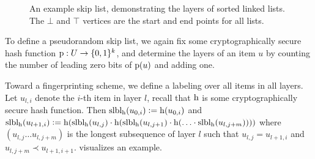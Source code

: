 \begin{figure*}
\begin{scaletikzpicturetowidth}{\textwidth}
\end{scaletikzpicturetowidth}

\caption{
An example skip list, demonstrating the layers of sorted linked lists. The $\bot$ and $\top$ vertices are the start and end points for all lists.
}

\label{fig:skip-list-example}
\end{figure*}

To define a pseudorandom skip list, we again fix some cryptographically secure hash function ${\operatorname{p}}: {U} \rightarrow {\{0, 1\}^k}$, and determine the layers of an item $u$ by counting the number of leading zero bits of $\operatorname{p}(u)$ and adding one.

Toward a fingerprinting scheme, we define a labeling over all items in all layers. Let $u_{l, i}$ denote the $i$-th item in layer $l$, recall that $\operatorname{h}$ is some cryptographically secure hash function.
Then $\operatorname{slbl_{\operatorname{h}}}(u_{0, i}) \vcentcolon= \operatorname{h}(u_{0, i})$ and $\operatorname{slbl_{\operatorname{h}}}(u_{l + 1, i}) \vcentcolon= \operatorname{h}(\operatorname{slbl_{\operatorname{h}}}(u_{l, j}) \cdot \operatorname{h}( \operatorname{slbl_{\operatorname{h}}}(u_{l, j + 1}) \cdot \operatorname{h}(\ldots \cdot \operatorname{slbl_{\operatorname{h}}}(u_{l, j + m}))))$ where $(u_{l, j} \ldots u_{l, j + m})$ is the longest subsequence of layer $l$ such that $u_{l, j} = u_{l + 1, i}$ and $u_{l, j + m} \prec u_{l + 1, i + 1}$.  visualizes an example.


